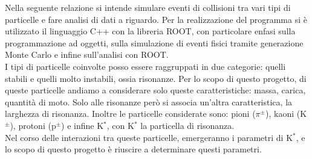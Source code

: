 Nella seguente relazione si intende simulare eventi di collisioni tra vari tipi di particelle e fare analisi di dati a riguardo. Per la realizzazione del programma si è utilizzato il linguaggio C++ con la libreria ROOT, con particolare enfasi sulla programmazione ad oggetti, sulla simulazione di eventi fisici tramite generazione Monte Carlo e infine sull'analisi con ROOT.\\

I tipi di particelle coinvolte posso essere raggruppati in due categorie: quelli stabili e quelli molto instabili, ossia risonanze. Per lo scopo di questo progetto, di queste particelle andiamo a considerare solo queste caratteristiche: massa, carica, quantità di moto. Solo alle risonanze però si associa un'altra caratteristica, la larghezza di risonanza. Inoltre le particelle considerate sono: pioni ($\pi^\pm$), kaoni (K$^\pm$), protoni (p$^\pm$) e infine K$^*$, con K$^*$ la particella di risonanza. \\

Nel corso delle interazioni tra queste particelle, emergeranno i parametri di K$^*$, e lo scopo di questo progetto è riuscire a determinare questi parametri.\\